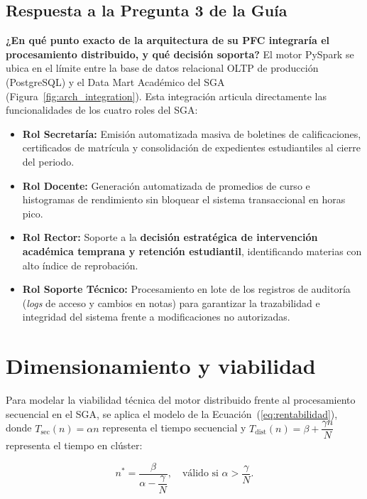 \documentclass[11pt,a4paper]{article}
\begin{document}
\subsection{Respuesta a la Pregunta 3 de la Guía}
\textbf{¿En qué punto exacto de la arquitectura de su PFC integraría el procesamiento distribuido, y qué decisión soporta?}  
El motor PySpark se ubica en el límite entre la base de datos relacional OLTP de producción (PostgreSQL) y el Data Mart Académico del SGA (Figura~\ref{fig:arch_integration}).  
Esta integración articula directamente las funcionalidades de los cuatro roles del SGA:
\begin{itemize}
    \item \textbf{Rol Secretaría:} Emisión automatizada masiva de boletines de calificaciones, certificados de matrícula y consolidación de expedientes estudiantiles al cierre del periodo.
    \item \textbf{Rol Docente:} Generación automatizada de promedios de curso e histogramas de rendimiento sin bloquear el sistema transaccional en horas pico.
    \item \textbf{Rol Rector:} Soporte a la \textbf{decisión estratégica de intervención académica temprana y retención estudiantil}, identificando materias con alto índice de reprobación.
    \item \textbf{Rol Soporte Técnico:} Procesamiento en lote de los registros de auditoría (\textit{logs} de acceso y cambios en notas) para garantizar la trazabilidad e integridad del sistema frente a modificaciones no autorizadas.
\end{itemize}

\section{Dimensionamiento y viabilidad}

Para modelar la viabilidad técnica del motor distribuido frente al procesamiento secuencial en el SGA, se aplica el modelo de la Ecuación~(\ref{eq:rentabilidad}), donde $T_{\text{sec}}(n) = \alpha n$ representa el tiempo secuencial y $T_{\text{dist}}(n) = \beta + \dfrac{\gamma n}{N}$ representa el tiempo en clúster:

\begin{equation}
n^* = \frac{\beta}{\alpha - \dfrac{\gamma}{N}}, \quad \text{válido si } \alpha > \frac{\gamma}{N}.
\label{eq:rentabilidad}
\end{equation}
\end{document}
